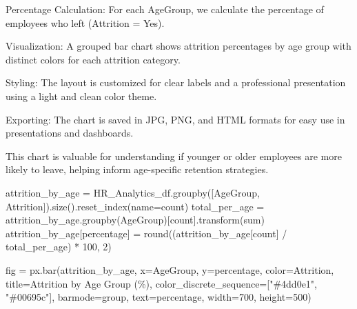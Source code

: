 \documentclass[
  letterpaper,
  DIV=11,
  numbers=noendperiod]{scrartcl}
\newenvironment{Shaded}{\begin{snugshade}}{\end{snugshade}}
\newcommand{\BuiltInTok}[1]{\textcolor[rgb]{0.00,0.23,0.31}{#1}}
\newcommand{\DecValTok}[1]{\textcolor[rgb]{0.68,0.00,0.00}{#1}}
\newcommand{\NormalTok}[1]{\textcolor[rgb]{0.00,0.23,0.31}{#1}}
\newcommand{\OperatorTok}[1]{\textcolor[rgb]{0.37,0.37,0.37}{#1}}
\newcommand{\StringTok}[1]{\textcolor[rgb]{0.13,0.47,0.30}{#1}}
\begin{document}
Percentage Calculation: For each AgeGroup, we calculate the percentage
of employees who left (Attrition = Yes).

Visualization: A grouped bar chart shows attrition percentages by age
group with distinct colors for each attrition category.

Styling: The layout is customized for clear labels and a professional
presentation using a light and clean color theme.

Exporting: The chart is saved in JPG, PNG, and HTML formats for easy use
in presentations and dashboards.

This chart is valuable for understanding if younger or older employees
are more likely to leave, helping inform age-specific retention
strategies.

\begin{Shaded}
\begin{Highlighting}[]
\NormalTok{attrition\_by\_age }\OperatorTok{=}\NormalTok{ HR\_Analytics\_df.groupby([}\StringTok{\textquotesingle{}AgeGroup\textquotesingle{}}\NormalTok{, }\StringTok{\textquotesingle{}Attrition\textquotesingle{}}\NormalTok{]).size().reset\_index(name}\OperatorTok{=}\StringTok{\textquotesingle{}count\textquotesingle{}}\NormalTok{)}
\NormalTok{total\_per\_age }\OperatorTok{=}\NormalTok{ attrition\_by\_age.groupby(}\StringTok{\textquotesingle{}AgeGroup\textquotesingle{}}\NormalTok{)[}\StringTok{\textquotesingle{}count\textquotesingle{}}\NormalTok{].transform(}\StringTok{\textquotesingle{}sum\textquotesingle{}}\NormalTok{)}
\NormalTok{attrition\_by\_age[}\StringTok{\textquotesingle{}percentage\textquotesingle{}}\NormalTok{] }\OperatorTok{=} \BuiltInTok{round}\NormalTok{((attrition\_by\_age[}\StringTok{\textquotesingle{}count\textquotesingle{}}\NormalTok{] }\OperatorTok{/}\NormalTok{ total\_per\_age) }\OperatorTok{*} \DecValTok{100}\NormalTok{, }\DecValTok{2}\NormalTok{)}

\NormalTok{fig }\OperatorTok{=}\NormalTok{ px.bar(attrition\_by\_age,}
\NormalTok{             x}\OperatorTok{=}\StringTok{\textquotesingle{}AgeGroup\textquotesingle{}}\NormalTok{,}
\NormalTok{             y}\OperatorTok{=}\StringTok{\textquotesingle{}percentage\textquotesingle{}}\NormalTok{,}
\NormalTok{             color}\OperatorTok{=}\StringTok{\textquotesingle{}Attrition\textquotesingle{}}\NormalTok{,}
\NormalTok{             title}\OperatorTok{=}\StringTok{\textquotesingle{}Attrition by Age Group (\%)\textquotesingle{}}\NormalTok{,}
\NormalTok{             color\_discrete\_sequence}\OperatorTok{=}\NormalTok{[}\StringTok{"\#4dd0e1"}\NormalTok{, }\StringTok{"\#00695c"}\NormalTok{],}
\NormalTok{             barmode}\OperatorTok{=}\StringTok{\textquotesingle{}group\textquotesingle{}}\NormalTok{,}
\NormalTok{             text}\OperatorTok{=}\StringTok{\textquotesingle{}percentage\textquotesingle{}}\NormalTok{,}
\NormalTok{             width}\OperatorTok{=}\DecValTok{700}\NormalTok{,}
\NormalTok{             height}\OperatorTok{=}\DecValTok{500}\NormalTok{)}


\end{Highlighting}
\end{Shaded}
\end{document}

